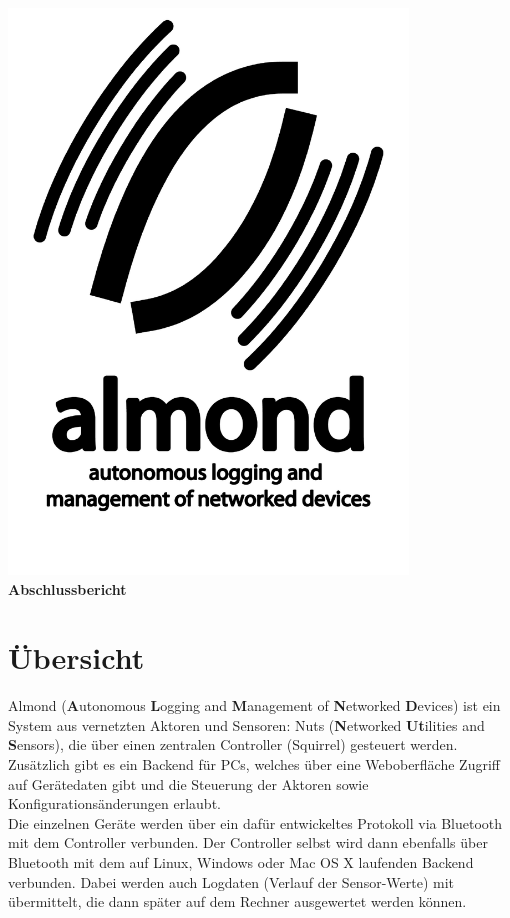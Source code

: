 \documentclass[12pt,a4paper]{article}
\begin{document}
\begin{titlepage}
	\begin{center}
		\includegraphics[height=15cm]{./logo.pdf}\\
		{\LARGE \bf Abschlussbericht}\\[0.3cm]
	\end{center}
\end{titlepage}

\tableofcontents

\newpage


\section{Übersicht}
Almond ({\bf A}utonomous {\bf L}ogging and {\bf M}anagement of {\bf N}etworked {\bf D}evices) ist ein System aus vernetzten Aktoren und Sensoren: Nuts ({\bf N}etworked {\bf Ut}ilities and {\bf S}ensors), die über einen zentralen Controller (Squirrel) gesteuert werden. Zusätzlich gibt es ein Backend für PCs, welches über eine Weboberfläche Zugriff auf Gerätedaten gibt und die Steuerung der Aktoren sowie Konfigurationsänderungen erlaubt.\\
Die einzelnen Geräte werden über ein dafür entwickeltes Protokoll via Bluetooth mit dem Controller verbunden. Der Controller selbst wird dann ebenfalls über Bluetooth mit dem auf Linux, Windows oder Mac OS X laufenden Backend verbunden. Dabei werden auch Logdaten (Verlauf der Sensor-Werte) mit übermittelt, die dann später auf dem Rechner ausgewertet werden können.
\end{document}
